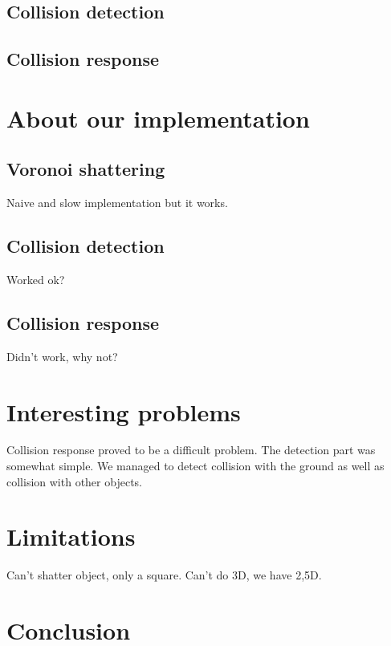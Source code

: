 \documentclass[10pt]{article}
\begin{document}
\subsection{Collision detection}

\subsection{Collision response}


\FloatBarrier


\newpage
\section{About our implementation}
\subsection{Voronoi shattering}
Naive and slow implementation but it works.

\subsection{Collision detection}
Worked ok?

\subsection{Collision response}
Didn't work, why not?

\section{Interesting problems}
Collision response proved to be a difficult problem. The detection part was somewhat
simple. We managed to detect collision with the ground as well as collision with
other objects.

\section{Limitations}
Can't shatter object, only a square. Can't do 3D, we have 2,5D.

\section{Conclusion}
\end{document}
